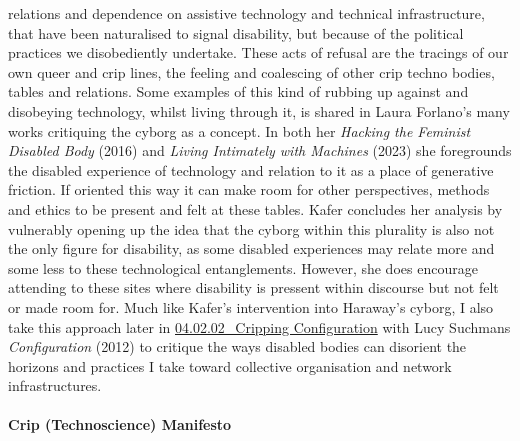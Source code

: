 relations and dependence on assistive technology and technical
infrastructure, that have been naturalised to signal disability, but
because of the political practices we disobediently undertake. These
acts of refusal are the tracings of our own queer and crip lines, the
feeling and coalescing of other crip techno bodies, tables and
relations. Some examples of this kind of rubbing up against and
disobeying technology, whilst living through it, is shared in Laura
Forlano's many works critiquing the cyborg as a concept. In both her
\emph{Hacking the Feminist Disabled Body} (2016) and \emph{Living
Intimately with Machines} (2023) she foregrounds the disabled experience
of technology and relation to it as a place of generative friction. If
oriented this way it can make room for other perspectives, methods and
ethics to be present and felt at these tables. Kafer concludes her
analysis by vulnerably opening up the idea that the cyborg within this
plurality is also not the only figure for disability, as some disabled
experiences may relate more and some less to these technological
entanglements. However, she does encourage attending to these sites
where disability is pressent within discourse but not felt or made room
for. Much like Kafer's intervention into Haraway's cyborg, I also take
this approach later in
\href{../../04_Configure-able_Methods/sections/04.02.02_Cripping\%20Configuration.md}{04.02.02\_Cripping
Configuration} with Lucy Suchmans \emph{Configuration} (2012) to
critique the ways disabled bodies can disorient the horizons and
practices I take toward collective organisation and network
infrastructures.

\hypertarget{crip-technoscience-manifesto}{%
\paragraph{Crip (Technoscience)
Manifesto}\label{crip-technoscience-manifesto}}

